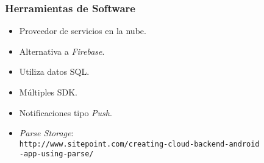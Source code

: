 \begin{frame}
	\frametitle{Herramientas de Software}
		\begin{itemize}
			\item Proveedor de servicios en la nube.
			\item Alternativa a {\it Firebase}.
			\item Utiliza datos SQL.
			\item Múltiples SDK.
			\item Notificaciones tipo {\it Push}.
		\end{itemize}
	\endblock{}
		\begin{itemize}
			\item {\it Parse Storage}:\\ {\texttt{http://www.sitepoint.com/creating-cloud-backend-android\\-app-using-parse/}}
		\end{itemize}
	\endblock{}
\end{frame}